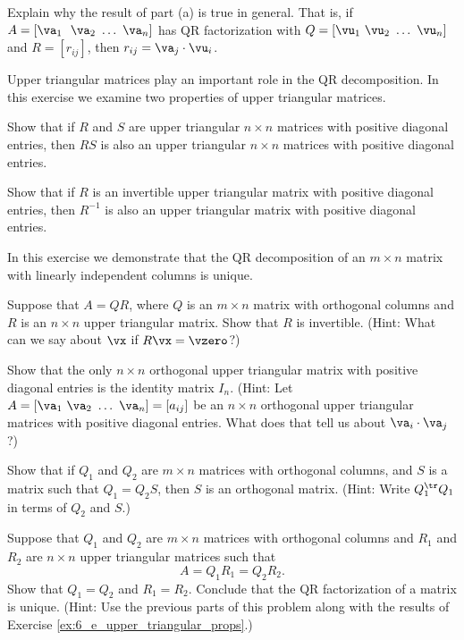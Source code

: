 \item Explain why the result of part (a) is true in general. That is, if $A = [\va_1 \ \ \va_2 \ \ldots \ \va_n]$ has QR factorization with $Q = [\vu_1 \ \vu_2 \ \ldots \ \vu_n]$ and $R = [r_{ij}]$, then $r_{ij} = \va_j \cdot \vu_i$. 

\ea

\item \label{ex:6_e_upper_triangular_props} Upper triangular matrices play an important role in the QR decomposition. In this exercise we examine two properties of upper triangular matrices. 
\ba
\item Show that if $R$ and $S$ are upper triangular $n \times n$ matrices with positive diagonal entries, then $RS$ is also an upper triangular $n \times n$ matrices with positive diagonal entries.

\item Show that if $R$ is an invertible upper triangular matrix with positive diagonal entries, then $R^{-1}$ is also an upper triangular matrix with positive diagonal entries. 


\ea

\item In this exercise we demonstrate that the QR decomposition of an $m \times n$ matrix with linearly independent columns is unique. 
\ba
\item Suppose that $A = QR$, where $Q$ is an $m \times n$ matrix with orthogonal columns and $R$ is an $n \times n$ upper triangular matrix. Show that $R$ is invertible. (Hint: What can we say about $\vx$ if $R \vx = \vzero$?)

\item Show that the only $n \times n$ orthogonal upper triangular matrix with positive diagonal entries is the identity matrix $I_n$. (Hint: Let $A =  [\va_1 \ \va_2 \ \ldots \ \va_n] = [a_{ij}]$ be an $n \times n$ orthogonal upper triangular matrices with positive diagonal entries. What does that tell us about $\va_i \cdot \va_j$?)
 
\item Show that if $Q_1$ and $Q_2$ are $m \times n$ matrices with orthogonal columns, and $S$ is a matrix such that $Q_1 = Q_2S$, then $S$ is an orthogonal matrix.  (Hint: Write $Q_1^{\tr}Q_1$ in terms of $Q_2$ and $S$.)

\item Suppose that $Q_1$ and $Q_2$ are $m \times n$ matrices with orthogonal columns and $R_1$ and $R_2$ are $n \times n$ upper triangular matrices such that 
\[A = Q_1R_1 = Q_2R_2.\]
Show that $Q_1 = Q_2$ and $R_1 = R_2$. Conclude that the QR factorization of a matrix is unique. (Hint: Use the previous parts of this problem along with the results of Exercise \ref{ex:6_e_upper_triangular_props}.)

